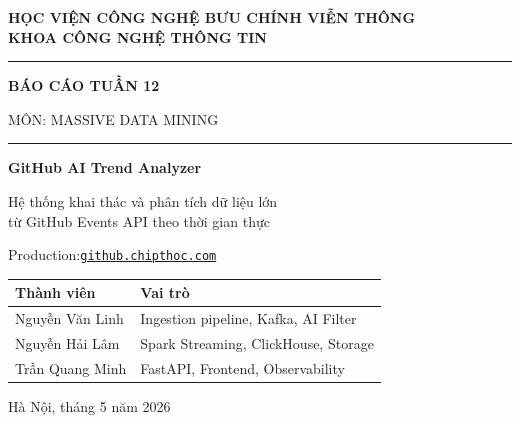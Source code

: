 \documentclass[12pt,a4paper]{article}
\newcommand{\tech}[1]{\texttt{#1}}
\begin{document}

\begin{titlepage}
  \centering
  \vspace*{2cm}
  {\Large\sffamily\bfseries HỌC VIỆN CÔNG NGHỆ BƯU CHÍNH VIỄN THÔNG\\[0.4em]
  KHOA CÔNG NGHỆ THÔNG TIN}\par
  \vspace{1.5cm}
  \rule{\linewidth}{1.5pt}\par
  \vspace{0.8cm}
  {\Huge\sffamily\bfseries\color{primaryblue} BÁO CÁO TUẦN 12}\par
  \vspace{0.5cm}
  {\Large\sffamily MÔN: MASSIVE DATA MINING}\par
  \vspace{1.2cm}
  \rule{\linewidth}{0.8pt}\par
  \vspace{1cm}
  {\LARGE\bfseries GitHub AI Trend Analyzer}\par
  \vspace{0.4cm}
  {\large Hệ thống khai thác và phân tích dữ liệu lớn\\
  từ GitHub Events API theo thời gian thực}\par
  \vspace{1cm}
  {\large Production:\;\href{https://github.chipthoc.com/}{\tech{github.chipthoc.com}}}\par
  \vspace{2cm}
  \begin{tabular}{ll}
    \toprule
    \textbf{Thành viên} & \textbf{Vai trò} \\
    \midrule
    Nguyễn Văn Linh     & Ingestion pipeline, Kafka, AI Filter \\
    Nguyễn Hải Lâm          & Spark Streaming, ClickHouse, Storage \\
    Trần Quang Minh      & FastAPI, Frontend, Observability \\
    \bottomrule
  \end{tabular}\par
  \vfill
  {\large Hà Nội, tháng 5 năm 2026}\par
\end{titlepage}

\tableofcontents
\newpage
\end{document}
